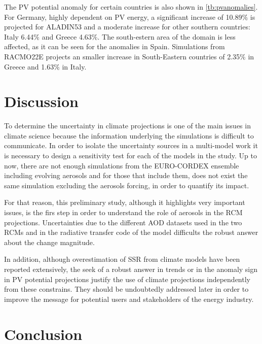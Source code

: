 The PV potential anomaly for certain countries is also shown in \ref{tb:pvanomalies}. For Germany, highly dependent on PV energy, a significant increase of 10.89$\%$ is projected for ALADIN53 and a moderate increase for other southern countries: Italy 6.44$\%$ and Greece 4.63$\%$. The south-estern area of the domain is less affected, as it can be seen for the anomalies in Spain. Simulations from RACMO22E projects an smaller increase in South-Eastern countries of 2.35$\%$ in Greece and 1.63$\%$ in Italy.



\section{Discussion}

To determine the uncertainty in climate projections is one of the main issues in climate science because the information underlying the simulations is difficult to communicate. In order to isolate the uncertainty sources in a multi-model work it is necessary to design a sensitivity test for each of the models in the study. Up to now, there are not enough simulations from the EURO-CORDEX ensemble including evolving aerosols and for those that include them, does not exist the same simulation excluding the aerosols forcing, in order to quantify its impact.

For that reason, this preliminary study, although it highlights very important issues, is the firs step in order to understand the role of aerosols in the RCM projections. Uncertainties due to the different AOD datasets used in the two RCMs and in the radiative transfer code of the model difficults the robust answer about the change magnitude. 

In addition, although overestimation of SSR from climate models have been reported extensively, the seek of a robust answer in trends or in the anomaly sign in PV potential projections justify the use of climate projections independently from these constrains. They should be undoubtedly addressed later in order to improve the message for potential users and stakeholders of the energy industry.

\section{Conclusion}

